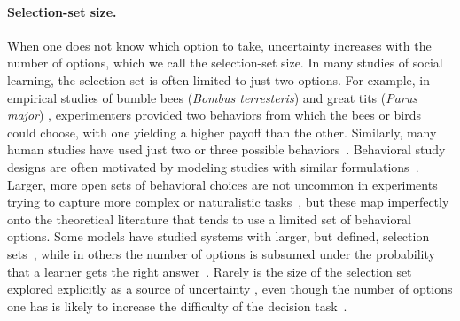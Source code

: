 \documentclass[letterpaper,11.5pt]{scrartcl}
\newcommand{\mt}[1]{{\textcolor{myorange} {({\tiny MT:} #1)}}}
\begin{document}
\paragraph{Selection-set size.}
When one does not know which option to take, uncertainty increases with the number of options, which we call the selection-set size.
In many studies of social learning, the selection set is often limited to just two options.  For example, in empirical studies of bumble bees (\emph{Bombus
terresteris}) \citep{Baracchi2018} and great tits (\emph{Parus major}) \citep{Aplin2017}, experimenters provided two behaviors from which the bees or birds
could choose, with one yielding a higher payoff than the other. %
Similarly, many human studies have used just two or three possible
behaviors~\citep{McElreath2005,Morgan2012, Toyokawa2019}. Behavioral study designs are
often motivated by modeling studies with similar formulations~\citep{Rogers1988,boyd1995does,Feldman1996,
perreault2012bayesian}.
Larger, more open sets of behavioral choices are not uncommon in experiments trying to capture more complex or naturalistic tasks~\citep{derex2013, wasielewski2014}, but these map imperfectly onto the theoretical literature that tends to use a limited set of behavioral options.
Some models have studied systems with larger, but defined, selection sets~\citep{Rendell2010, lindstrom2016co}, while in others the number of options is subsumed under the probability that a learner gets the right  answer~\citep{Feldman1996,Enquist2007}.
Rarely is the size of the selection set explored explicitly as a source of  uncertainty \citep[though see][]{Muthukrishna2016a}, even though the number of options one has is likely to increase the difficulty of the decision task~\citep{haynes2009testing,white2009testing}.  
\end{document}
